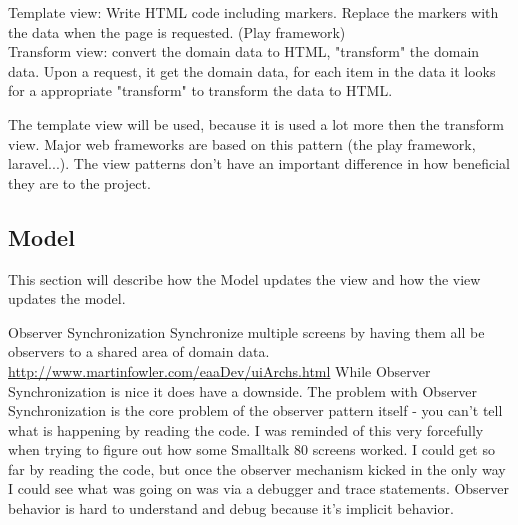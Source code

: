 Template view: Write HTML code including markers. Replace the markers with the data when the page is requested. (Play framework)\\
Transform view: convert the domain data to HTML, "transform" the domain data. Upon a request, it get the domain data, for each item in the data it looks for a appropriate "transform" to transform the data to HTML.

The template view will be used, because it is used a lot more then the transform view. Major web frameworks are based on this pattern (the play framework, laravel...). The view patterns don't have an important difference in how beneficial they are to the project.


\subsection{Model}

This section will describe how the Model updates the view and how the view updates the model.

Observer Synchronization
Synchronize multiple screens by having them all be observers to a shared area of domain data.
\url{http://www.martinfowler.com/eaaDev/uiArchs.html}
While Observer Synchronization is nice it does have a downside. The problem with Observer Synchronization is the core problem of the observer pattern itself - you can't tell what is happening by reading the code. I was reminded of this very forcefully when trying to figure out how some Smalltalk 80 screens worked. I could get so far by reading the code, but once the observer mechanism kicked in the only way I could see what was going on was via a debugger and trace statements. Observer behavior is hard to understand and debug because it's implicit behavior.

